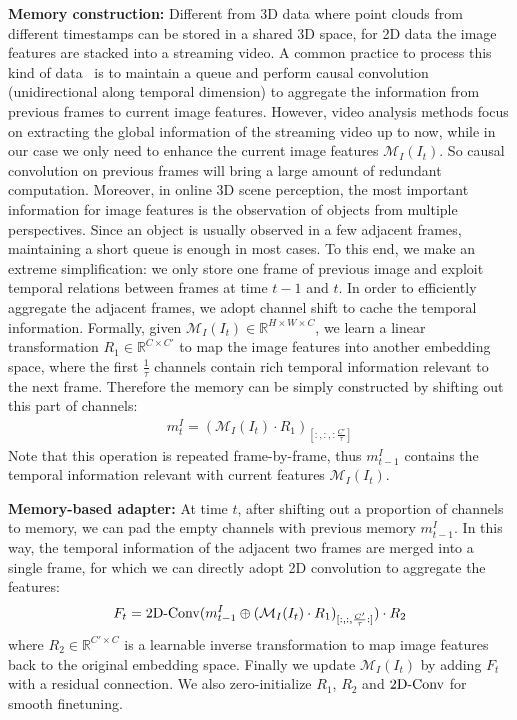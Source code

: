 \textbf{Memory construction:}
Different from 3D data where point clouds from different timestamps can be stored in a shared 3D space, for 2D data the image features are stacked into a streaming video.
A common practice to process this kind of data~\cite{kondratyuk2021movinets} is to maintain a queue and perform causal convolution (unidirectional along temporal dimension) to aggregate the information from previous frames to current image features. However, video analysis methods focus on extracting the global information of the streaming video up to now, while in our case we only need to enhance the current image features $\mathcal{M}_{I}(I_t)$. So causal convolution on previous frames will bring a large amount of redundant computation. 
Moreover, in online 3D scene perception, the most important information for image features is the observation of objects from multiple perspectives. Since an object is usually observed in a few adjacent frames, maintaining a short queue is enough in most cases.
To this end, we make an extreme simplification: we only store one frame of previous image and exploit temporal relations between frames at time $t-1$ and $t$.
In order to efficiently aggregate the adjacent frames, we adopt channel shift to cache the temporal information. Formally, given $\mathcal{M}_{I}(I_t)\in \mathbb{R}^{H\times W\times C}$, we learn a linear transformation $R_1\in \mathbb{R}^{C\times C'}$ to map the image features into another embedding space, where the first $\frac{1}{\tau}$ channels contain rich temporal information relevant to the next frame. Therefore the memory can be simply constructed by shifting out this part of channels:
\begin{gather}
    m^I_t=(\mathcal{M}_{I}(I_t)\cdot R_1)_{[:,:,:\frac{C'}{\tau}]}
\end{gather}
Note that this operation is repeated frame-by-frame, thus $m^I_{t-1}$ contains the temporal information relevant with current features $\mathcal{M}_{I}(I_t)$.

\textbf{Memory-based adapter:}
At time $t$, after shifting out a proportion of channels to memory, we can pad the empty channels with previous memory $m^I_{t-1}$. In this way, the temporal information of the adjacent two frames are merged into a single frame, for which we can directly adopt 2D convolution to aggregate the features:
\begin{gather}
    F_t={\rm 2D\text{-}Conv}(m^I_{t-1}\oplus(\mathcal{M}_{I}(I_t)\cdot R_1)_{[:,:,\frac{C'}{\tau}:]})\cdot R_2
\end{gather}
where $R_2\in \mathbb{R}^{C'\times C}$ is a learnable inverse transformation to map image features back to the original embedding space.
Finally we update $\mathcal{M}_{I}(I_t)$ by adding $F_t$ with a residual connection. We also zero-initialize $R_1$, $R_2$ and ${\rm 2D\text{-}Conv}$ for smooth finetuning.


